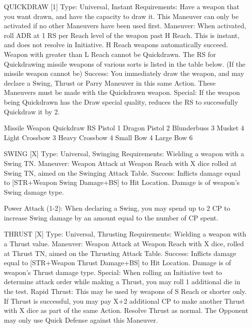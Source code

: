 \documentclass[oneside,11pt,english]{book}
\begin{document}
 

QUICKDRAW [1] 
Type: Universal, Instant 
Requirements: Have a weapon that you want drawn, and have the capacity to draw it. This Maneuver 
can only be activated if no other Maneuvers have been used first. 
Maneuver: When activated, roll ADR at 1 RS per Reach level of the weapon past H Reach. This is 
instant, and does not resolve in Initiative. H Reach weapons automatically succeed. Weapon with greater 
than L Reach cannot be Quickdrawn. 
The RS for Quickdrawing missile weapons of various sorts is listed in the table below. (If the missile 
weapon cannot be)
Success: You immediately draw the weapon, and may declare a Swing, Thrust or Parry Maneuver in this 
same Action. These Maneuvers must be made with the Quickdrawn weapon. 
Special: If the weapon being Quickdrawn has the Draw special quality, reduces the RS to successfully 
Quickdraw it by 2. 

 

Missile Weapon Quickdraw RS 
Pistol 1 
Dragon Pistol 2 
Blunderbuss 3 
Musket 4 
Light Crossbow 3 
Heavy Crossbow 4 
Small Bow 4 
Large Bow 6 

 
SWING [X] 
Type: Universal, Swinging 
Requirements: Wielding a weapon with a Swing TN. 
Maneuver: Weapon Attack at Weapon Reach with X dice rolled at Swing TN, aimed on the Swinging 
Attack Table. 
Success: Inflicts damage equal to [STR+Weapon Swing Damage+BS] to Hit Location. Damage is of 
weapon’s Swing damage type. 


Power Attack (1-2): When declaring a Swing, you may spend up to 2 CP to increase Swing damage by 
an amount equal to the number of CP spent. 

 

THRUST [X] 
Type: Universal, Thrusting 
Requirements: Wielding a weapon with a Thrust value. 
Maneuver: Weapon Attack at Weapon Reach with X dice, rolled at Thrust TN, aimed on the Thrusting 
Attack Table. 
Success: Inflicts damage equal to [STR+Weapon Thrust Damage+BS] to Hit Location. Damage is of 
weapon’s Thrust damage type. 
Special: When rolling an Initiative test to determine attack order while making a Thrust, you may roll 1 
additional die in the test. 
Rapid Thrust: This may be used by weapons of S Reach or shorter only. If Thrust is successful, you may 
pay X+2 additional CP to make another Thrust with X dice as part of the same Action. Resolve Thrust as 
normal. The Opponent may only use Quick Defense against this Maneuver. 

 

 
\end{document}
